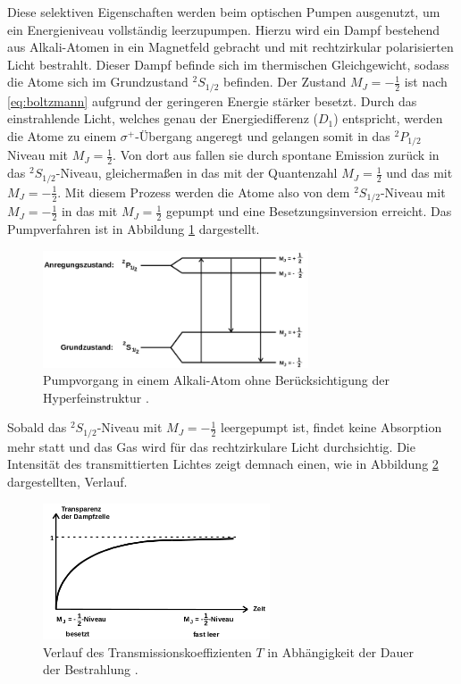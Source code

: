 Diese selektiven Eigenschaften werden beim optischen Pumpen ausgenutzt, um ein Energieniveau vollständig leerzupumpen.
Hierzu wird ein Dampf bestehend aus Alkali-Atomen in ein Magnetfeld gebracht und mit rechtzirkular polarisierten Licht bestrahlt.
Dieser Dampf befinde sich im thermischen Gleichgewicht, sodass die Atome sich im Grundzustand $^2S_{1/2}$ befinden.
Der Zustand $M_J = -\frac{1}{2}$ ist nach \eqref{eq:boltzmann} aufgrund der geringeren Energie stärker besetzt.
Durch das einstrahlende Licht, welches genau der Energiedifferenz ($D_1$) entspricht, werden die Atome zu einem $\sigma^{+}$-Übergang angeregt und gelangen somit in das $^2P_{1/2}$ Niveau mit $M_J=\frac{1}{2}$.
Von dort aus fallen sie durch spontane Emission zurück in das $^2S_{1/2}$-Niveau, gleichermaßen in das mit der Quantenzahl $M_J = \frac{1}{2}$ und das mit $M_J=-\frac{1}{2}$.
Mit diesem Prozess werden die Atome also von dem $^2S_{1/2}$-Niveau mit $M_J=-\frac{1}{2}$ in das mit $M_J=\frac{1}{2}$ gepumpt und eine Besetzungsinversion erreicht.
Das Pumpverfahren ist in Abbildung \ref{fig:tfig4} dargestellt.
\FloatBarrier
\begin{figure}[h]
    \centering
    \includegraphics[width=0.7\textwidth]{pumpen.png}
    \caption{Pumpvorgang in einem Alkali-Atom ohne Berücksichtigung der Hyperfeinstruktur \cite{quelle01}.}
    \label{fig:tfig4}
\end{figure}
\FloatBarrier
\noindent
Sobald das $^2S_{1/2}$-Niveau mit $M_J=-\frac{1}{2}$ leergepumpt ist, findet keine Absorption mehr statt und das Gas wird für das rechtzirkulare Licht durchsichtig.
Die Intensität des transmittierten Lichtes zeigt demnach einen, wie in Abbildung \ref{fig:tfig5} dargestellten, Verlauf.
\FloatBarrier
\begin{figure}[h]
    \centering
    \includegraphics[width=0.6\textwidth]{transmission.png}
    \caption{Verlauf des Transmissionskoeffizienten $T$ in Abhängigkeit der Dauer der Bestrahlung \cite{quelle01}.}
    \label{fig:tfig5}
\end{figure}
\FloatBarrier
\noindent


